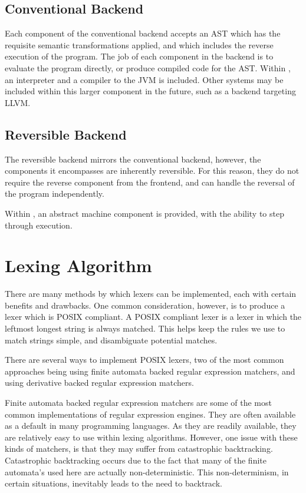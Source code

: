 \subsection{Conventional Backend}

Each component of the conventional backend accepts an AST which has the requisite semantic transformations applied, and which includes the reverse execution of the program. The job of each component in the backend is to evaluate the program directly, or produce compiled code for the AST.
Within \rimp, an interpreter and a compiler to the JVM is included. Other systems may be included within this larger component in the future, such as a backend targeting LLVM. 

\subsection{Reversible Backend}

The reversible backend mirrors the conventional backend, however, the components it encompasses are inherently reversible. For this reason, they do not require the reverse component from the frontend, and can handle the reversal of the program independently.

Within \rimp, an abstract machine component is provided, with the ability to step through execution. 

\section{Lexing Algorithm}

There are many methods by which lexers can be implemented, each with certain benefits and drawbacks. One common consideration, however, is to produce a lexer which is POSIX compliant. A POSIX compliant lexer is a lexer in which the leftmost longest string is always matched. This helps keep the rules we use to match strings simple, and disambiguate potential matches.

There are several ways to implement POSIX lexers, two of the most common approaches being using finite automata backed regular expression matchers, and using derivative backed regular expression matchers.

Finite automata backed regular expression matchers are some of the most common implementations of regular expression engines. They are often available as a default in many programming languages. As they are readily available, they are relatively easy to use within lexing algorithms. However, one issue with these kinds of matchers, is that they may suffer from catastrophic backtracking. Catastrophic backtracking occurs due to the fact that many of the finite automata's used here are actually non-deterministic. This non-determinism, in certain situations, inevitably leads to the need to backtrack. 

